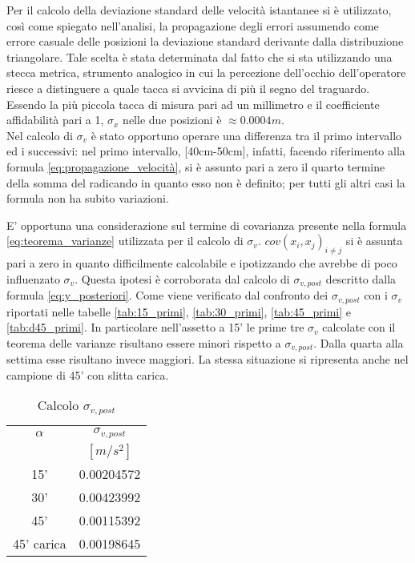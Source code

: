 \documentclass[a4paper,11pt,oneside]{article}
\begin{document}
Per il calcolo della deviazione standard delle velocità istantanee si è utilizzato, così come spiegato nell'analisi, la propagazione degli errori assumendo come errore casuale delle posizioni la deviazione standard derivante dalla distribuzione triangolare. Tale scelta è stata determinata dal fatto che si sta utilizzando una stecca metrica, strumento analogico in cui la percezione dell'occhio dell'operatore riesce a distinguere a quale tacca si avvicina di più il segno del traguardo. Essendo la più piccola tacca di misura pari ad un millimetro e il coefficiente affidabilità pari a 1, $\sigma_x$ nelle due posizioni è $\approx0.0004\si{m}$.\\
Nel calcolo di $\sigma_v$ è stato opportuno operare una differenza tra il primo intervallo ed i successivi: nel primo intervallo, [40cm-50cm], infatti, facendo riferimento alla formula \ref{eq:propagazione_velocità}, si è assunto pari a zero il quarto termine della somma del radicando in quanto esso non è definito; per tutti gli altri casi la formula non ha subito variazioni.

E' opportuna una considerazione sul termine di covarianza presente nella formula \ref{eq:teorema_varianze} utilizzata per il calcolo di $\sigma_v$. $cov(x_{i},x_{j})_{i \neq j}$  si è assunta pari a zero in quanto difficilmente calcolabile e ipotizzando che avrebbe di poco influenzato $\sigma_{v}$. Questa ipotesi è corroborata dal calcolo di $\sigma_{v, post}$ descritto dalla formula \ref{eq:y_posteriori}. Come viene verificato dal confronto dei $\sigma_{v, post}$ con i $\sigma_{v}$ riportati nelle tabelle \ref{tab:15_primi}, \ref{tab:30_primi}, \ref{tab:45_primi} e \ref{tab:d45_primi}. In particolare nell'assetto a 15' le prime tre $\sigma_{v}$ calcolate con il teorema delle varianze risultano essere minori rispetto a $\sigma_{v, post}$. Dalla quarta alla settima esse risultano invece maggiori. La stessa situazione si ripresenta anche nel campione di 45' con slitta carica.
\begin{wraptable}{l}{5cm}%
\centering
    \begin{tabular}{c|c}
        \toprule
        $\alpha$ & $\sigma_{v, post}$ \\
        & $[\si{m/s^{2}}]$\\
        \midrule
        15' &  0.00204572\\
        30' & 0.00423992 \\
        45' & 0.00115392 \\
        45' carica & 0.00198645 \\
        \bottomrule
    \end{tabular}
    \caption{Calcolo $\sigma_{v, post}$}
    \label{tab:v_post}
\end{wraptable}
\end{document}
